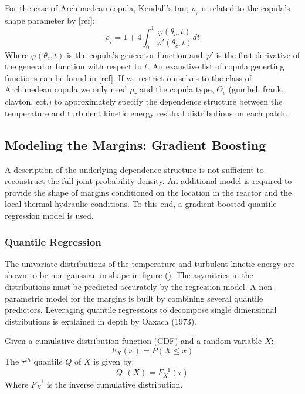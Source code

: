 For the case of Archimedean copula, Kendall's tau, $\rho_\tau$ is
related to the copula's shape parameter by [ref]:
\begin{equation}
\rho_\tau = 1 + 4 \int_0^1 \frac{\varphi(\theta_c,t)}{\varphi'(\theta_c, t)}dt
\end{equation}
Where $\varphi(\theta_c, t)$ is the copula's generator function and $\varphi'$ is the first derivative of the generator function with respect to $t$.  An exaustive list of copula generting functions can be found in [ref].
If we restrict ourselves to the class of Archimedean copula we only need $\rho_\tau$ and the copula type, $\Theta_c$ (gumbel, frank, clayton, ect.) to approximately specify the dependence structure between the temperature and turbulent kinetic energy residual distributions on each patch.

\subsection{Modeling the Margins: Gradient Boosting}

A description of the underlying dependence structure is not sufficient to reconstruct the full joint probability density.  An additional model is required to provide the shape of margins conditioned on the location in the reactor and the local thermal hydraulic conditions.  To this end, a gradient boosted quantile regression model is used.

\subsubsection{Quantile Regression}

The univariate distributions of the temperature and turbulent kinetic energy are shown to be non gaussian in shape in figure ().  The asymitries in the distributions must be predicted accurately by the regression model.  A non-parametric model for the margins is built by combining several quantile predictors.  Leveraging quantile regressions to decompose single dimensional distributions is explained in depth by Oaxaca (1973).

Given a cumulative distribution function (CDF) and a random variable $X$:
\begin{equation}
F_X(x) = P(X \leq x)
\end{equation}
The $\tau^{th}$ quantile $Q$ of $X$ is given by:
\begin{equation}
Q_\tau(X) = F_X^{-1}(\tau)
\end{equation}
Where $F_X^{-1}$ is the inverse cumulative distribution.

